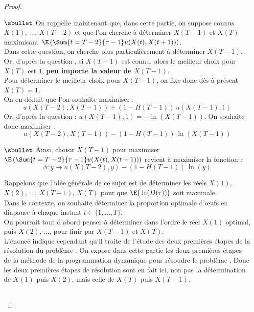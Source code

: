 \begin{proof}
\begin{noliste}{}
	\item[$\sbullet$] On rappelle maintenant que, dans cette partie, 
	on 
	suppose connus $X(1)$, $\ldots$, $X(T-2)$ et que l'on 
	cherche à déterminer $X(T-1)$ et $X(T)$ maximisant 
	$\E\left(\Sum{t=T-2}{\tau -1} u(X(t),X(t+1))\right)$.\\
	Dans cette question, on cherche plus particulièrement à 
	déterminer $X(T-1)$.\\
	Or, d'après la question , si $X(T-1)$ est connu,
	alors le meilleur choix pour $X(T)$ est $1$, {\bf peu 
	importe la valeur de $X(T-1)$}.\\
	Pour déterminer le meilleur choix pour $X(T-1)$, on fixe donc 
	dès à présent $X(T)=1$.\\
	On en déduit que l'on souhaite maximiser :
	\[
	  u(X(T-2),X(T-1)) + (1-H(T-1)) \, u(X(T-1),1)
	\]
	Or, d'après la question  : $u(X(T-1),1) = 
	-\ln(X(T-1))$. On souhaite donc maximiser :
	\[
	  u(X(T-2),X(T-1)) - (1- H(T-1)) \, \ln(X(T-1))
	\]
	
	\item[$\sbullet$] Ainsi, choisir $X(T-1)$ pour maximiser 
	$\E\left( 
	\Sum{t=T-2}{\tau -1} u(X(t),X(t+1))\right)$ revient à maximiser 
	la fonction :
	\[
	  \phi : y \mapsto u(X(T-2),y) - (1-H(T-1)) \, \ln(y)
	\]
      \end{noliste}
      
      
      \newpage
      
      
      \begin{remark}
        Rappelons que l'idée générale de ce sujet est de déterminer 
        les réels $X(1)$, $X(2)$, $\ldots$, $X(T-1)$, $X(T)$ pour 
        que $\E\big(\ln(D(\tau))\big)$ soit maximale.\\
        Dans le contexte, on souhaite déterminer la proportion optimale 
	d'{\oe}ufs en diapause à chaque instant $t \in \{1, \ldots, 
	T\}$.\\
	On pourrait tout d'abord penser à déterminer dans l'ordre le 
	réel $X(1)$ optimal, puis $X(2)$, $\ldots$, pour finir par 
	$X(T-1)$ et $X(T)$. \\
	L'énoncé indique cependant qu'il traite de 
	l'étude des deux premières étapes de la résolution du 
	problème : \og On expose dans cette partie les deux 
	premières étapes de la méthode de la programmation dynamique
	pour résoudre le problème \fg{}.
	Donc les deux premières étapes de résolution sont en fait ici,
	non pas la détermination de $X(1)$ puis $X(2)$, mais celle de 
	$X(T)$ puis $X(T-1)$.
      \end{remark}~\\[-1.4cm]
    \end{proof}

